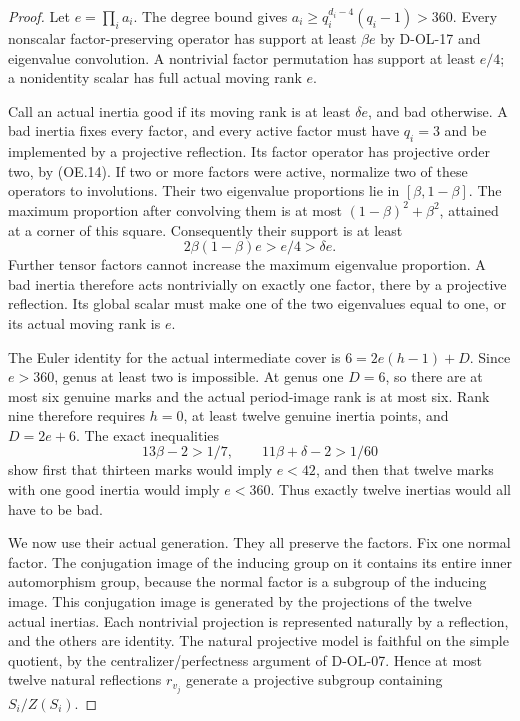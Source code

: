 \begin{proof}
Let $e=\prod_i a_i$.  The degree bound
\cite[Theorem~3.7, pp.~165--167]{OL:GLT2024} gives
$a_i\ge q_i^{d_i-4}(q_i-1)>360$.
Every nonscalar factor-preserving operator has support at
least $\beta e$ by D-OL-17 and eigenvalue convolution.
A nontrivial factor permutation has support at least $e/4$;
a nonidentity scalar has full actual moving rank $e$.

Call an actual inertia good if its moving rank is at least
$\delta e$, and bad otherwise.  A bad inertia fixes every
factor, and every active factor must have $q_i=3$ and be
implemented by a projective reflection.  Its factor
operator has projective order two, by (OE.14).
If two or more factors were active, normalize two of these
operators to involutions.  Their two eigenvalue proportions
lie in $[\beta,1-\beta]$.  The maximum proportion after
convolving them is at most
$(1-\beta)^2+\beta^2$, attained at a corner of this square.
Consequently their support is at least
\[
                       2\beta(1-\beta)e>e/4>\delta e.
                       \tag{OE.20}
\]
Further tensor factors cannot increase the maximum
eigenvalue proportion.  A bad inertia therefore acts
nontrivially on exactly one factor, there by a projective
reflection.  Its global scalar must make one of the two
eigenvalues equal to one, or its actual moving rank is $e$.

The Euler identity for the actual intermediate cover is
$6=2e(h-1)+D$.  Since $e>360$, genus at least two is
impossible.  At genus one $D=6$, so there are at most six
genuine marks and the actual period-image rank is at most
six.  Rank nine therefore requires $h=0$, at least twelve
genuine inertia points, and $D=2e+6$.
The exact inequalities
\[
                  13\beta-2>1/7,
             \qquad11\beta+\delta-2>1/60
             \tag{OE.21}
\]
show first that thirteen marks would imply $e<42$, and
then that twelve marks with one good inertia would imply
$e<360$.  Thus exactly twelve inertias would all have to
be bad.

We now use their actual generation.  They all preserve
the factors.  Fix one normal factor.  The conjugation
image of the inducing group on it contains its entire
inner automorphism group, because the normal factor is
a subgroup of the inducing image.  This conjugation image
is generated by the projections of the twelve actual
inertias.  Each nontrivial projection is represented
naturally by a reflection, and the others are identity.
The natural projective model is faithful on the simple
quotient, by the centralizer/perfectness argument of
D-OL-07.  Hence at most twelve natural reflections
$r_{v_j}$ generate a projective subgroup containing
$S_i/Z(S_i)$.


\end{proof}
